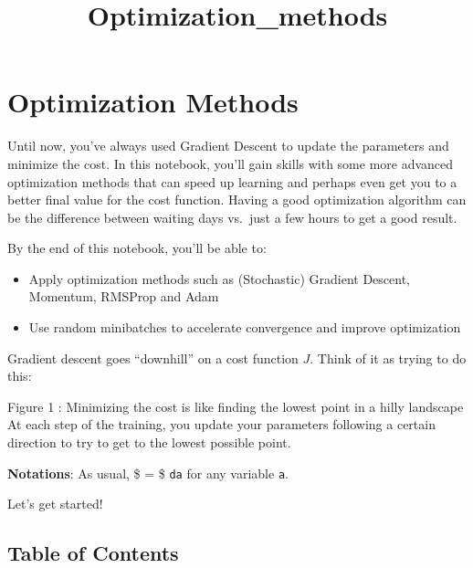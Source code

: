 \documentclass[11pt]{article}
\title{Optimization\_methods}
\providecommand{\tightlist}{%
      \setlength{\itemsep}{0pt}\setlength{\parskip}{0pt}}
\begin{document}
    
    \maketitle
    
    

    
    \hypertarget{optimization-methods}{%
\section{Optimization Methods}\label{optimization-methods}}

Until now, you've always used Gradient Descent to update the parameters
and minimize the cost. In this notebook, you'll gain skills with some
more advanced optimization methods that can speed up learning and
perhaps even get you to a better final value for the cost function.
Having a good optimization algorithm can be the difference between
waiting days vs.~just a few hours to get a good result.

By the end of this notebook, you'll be able to:

\begin{itemize}
\tightlist
\item
  Apply optimization methods such as (Stochastic) Gradient Descent,
  Momentum, RMSProp and Adam
\item
  Use random minibatches to accelerate convergence and improve
  optimization
\end{itemize}

Gradient descent goes ``downhill'' on a cost function \(J\). Think of it
as trying to do this:

Figure 1 : Minimizing the cost is like finding the lowest point in a
hilly landscape At each step of the training, you update your parameters
following a certain direction to try to get to the lowest possible
point.

\textbf{Notations}: As usual, \$ = \$
\texttt{da} for any variable \texttt{a}.

Let's get started!

    \hypertarget{table-of-contents}{%
\subsection{Table of Contents}\label{table-of-contents}}
\end{document}
